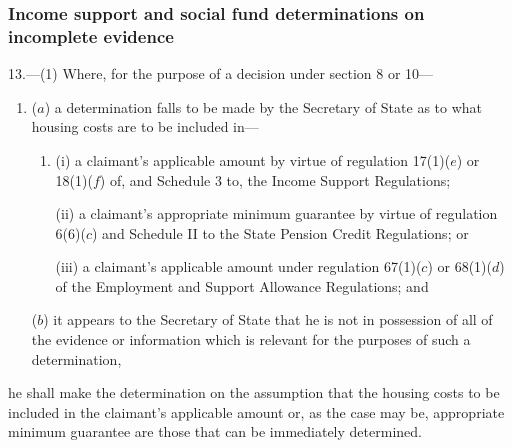 \documentclass[12pt,a4paper]{article}
\begin{document}

\subsubsection[13. Income support and social fund determinations on incomplete evidence]{\sloppy Income support and social fund determinations on incomplete evidence}

13.—(1) Where, for the purpose of a decision under section 8 or 10—
\begin{enumerate}\item[]

($a$) a determination falls to be made by the Secretary of State as to what housing costs are to be included in—
\begin{enumerate}\item[]
(i) a claimant’s applicable amount by virtue of regulation 17(1)($e$)  or 18(1)($f$)  of, and Schedule 3 to, the Income Support Regulations; 

(ii) a claimant’s appropriate minimum guarantee by virtue of regulation 6(6)($c$)  and Schedule II to the State Pension Credit Regulations; 
%
or

(iii) a claimant’s applicable amount under regulation 67(1)($c$)  or 68(1)($d$)  of the Employment and Support Allowance Regulations; and
\end{enumerate}

($b$) it appears to the Secretary of State that he is not in possession of all of the evidence or information which is relevant for the purposes of such a determination,
\end{enumerate}
he shall make the determination on the assumption that the housing costs to be included in the claimant’s 
applicable amount or, as the case may be, appropriate minimum guarantee are those  %
that can be immediately determined.
\end{document}
